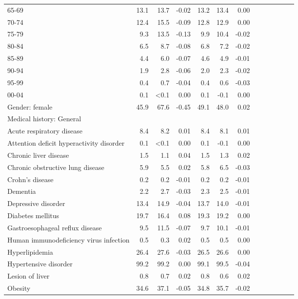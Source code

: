 \documentclass[11pt,]{article}
\begin{document}
\begin{longtable}{lrrrrrrrrrrrr}
      65-69 & 13.1 & 13.7 & -0.02 & 13.2 &  13.4 &  0.00 \\ 
      70-74 & 12.4 & 15.5 & -0.09 & 12.8 &  12.9 &  0.00 \\ 
      75-79 &  9.3 & 13.5 & -0.13 &  9.9 &  10.4 & -0.02 \\ 
      80-84 &  6.5 &  8.7 & -0.08 &  6.8 &   7.2 & -0.02 \\ 
      85-89 &  4.4 &  6.0 & -0.07 &  4.6 &   4.9 & -0.01 \\ 
      90-94 &  1.9 &  2.8 & -0.06 &  2.0 &   2.3 & -0.02 \\ 
      95-99 &  0.4 &  0.7 & -0.04 &  0.4 &   0.6 & -0.03 \\ 
      00-04 &  0.1 & <0.1 &  0.00 &  0.1 &  -0.1 &  0.00 \\ 
  Gender: female & 45.9 & 67.6 & -0.45 & 49.1 &  48.0 &  0.02 \\ 
  Medical history: General &    &    &     &    &     &     \\ 
      Acute respiratory disease &  8.4 &  8.2 &  0.01 &  8.4 &   8.1 &  0.01 \\ 
      Attention deficit hyperactivity disorder &  0.1 & <0.1 &  0.00 &  0.1 &  -0.1 &  0.00 \\ 
      Chronic liver disease &  1.5 &  1.1 &  0.04 &  1.5 &   1.3 &  0.02 \\ 
      Chronic obstructive lung disease &  5.9 &  5.5 &  0.02 &  5.8 &   6.5 & -0.03 \\ 
      Crohn's disease &  0.2 &  0.2 & -0.01 &  0.2 &   0.2 & -0.01 \\ 
      Dementia &  2.2 &  2.7 & -0.03 &  2.3 &   2.5 & -0.01 \\ 
      Depressive disorder & 13.4 & 14.9 & -0.04 & 13.7 &  14.0 & -0.01 \\ 
      Diabetes mellitus & 19.7 & 16.4 &  0.08 & 19.3 &  19.2 &  0.00 \\ 
      Gastroesophageal reflux disease &  9.5 & 11.5 & -0.07 &  9.7 &  10.1 & -0.01 \\ 
      Human immunodeficiency virus infection &  0.5 &  0.3 &  0.02 &  0.5 &   0.5 &  0.00 \\ 
      Hyperlipidemia & 26.4 & 27.6 & -0.03 & 26.5 &  26.6 &  0.00 \\ 
      Hypertensive disorder & 99.2 & 99.2 &  0.00 & 99.1 &  99.5 & -0.04 \\ 
      Lesion of liver &  0.8 &  0.7 &  0.02 &  0.8 &   0.6 &  0.02 \\ 
      Obesity & 34.6 & 37.1 & -0.05 & 34.8 &  35.7 & -0.02 \\ 

\end{longtable}
\end{document}
